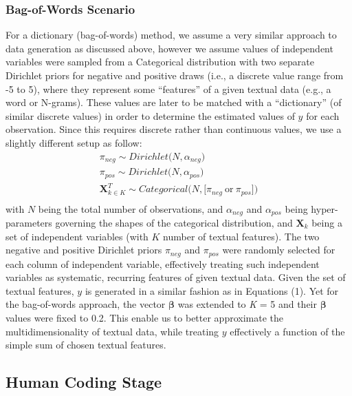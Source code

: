 \documentclass[man, 12pt, a4paper, nolmodern, noextraspace]{apa6}
\begin{document}
    \subsubsection{Bag-of-Words Scenario}
     For a dictionary (bag-of-words) method, we assume a very similar approach to data generation as discussed above, however we assume values of independent variables were sampled from a Categorical distribution with two separate Dirichlet priors for negative and positive draws (i.e., a discrete value range from -5 to 5), where they represent some \enquote{features} of a given textual data (e.g., a word or N-grams). These values are later to be matched with a \enquote{dictionary} (of similar discrete values) in order to determine the estimated values of $y$ for each observation. Since this requires discrete rather than continuous values, we use a slightly different setup as follow:
       \begin{equation}
        \begin{gathered}
            \pi_{neg} \sim Dirichlet\bigl(N, \alpha_{neg}\bigr) \\
            \pi_{pos} \sim Dirichlet\bigl(N, \alpha_{pos}\bigr) \\
            \boldsymbol{X}_{k \in K}^T \sim Categorical\bigl(N, \bigl[\pi_{neg}\ \textrm{or}\ \pi_{pos}\bigr]\bigr) \\
        \end{gathered}
    \end{equation}
    \noindent with $N$ being the total number of observations, and $\alpha_{neg}$ and $\alpha_{pos}$ being hyper-parameters governing the shapes of the categorical distribution, and $\boldsymbol{X}_k$ being a set of independent variables (with $K$ number of textual features). The two negative and positive Dirichlet priors $\pi_{neg}$ and $\pi_{pos}$ were randomly selected for each column of independent variable, effectively treating such independent variables as systematic, recurring features of given textual data. Given the set of textual features, $y$ is generated in a similar fashion as in Equations (1). Yet for the bag-of-words approach, the vector $\boldsymbol{\beta}$ was extended to \textit{K} = 5 and their $\boldsymbol{\beta}$ values were fixed to 0.2. This enable us to better approximate the multidimensionality of textual data, while treating $y$ effectively a function of the simple sum of chosen textual features. 

    \subsection{Human Coding Stage}
    
\end{document}
